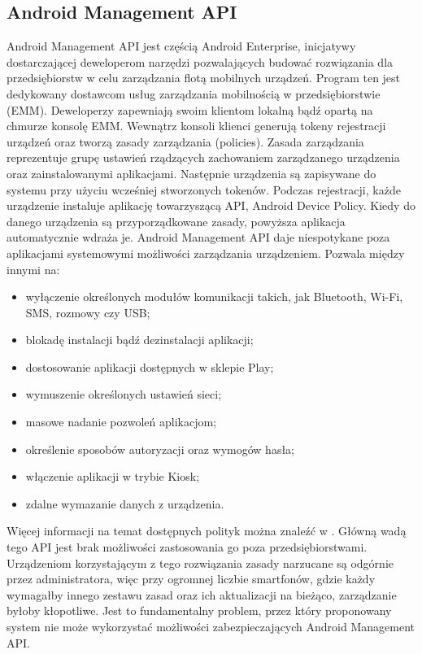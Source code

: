 \subsection{Android Management API}
Android Management API \cite{AM-API} jest częścią Android Enterprise, inicjatywy dostarczającej deweloperom narzędzi pozwalających budować rozwiązania dla przedsiębiorstw w celu zarządzania flotą mobilnych urządzeń. Program ten jest dedykowany dostawcom usług zarządzania mobilnością w przedsiębiorstwie (EMM). Deweloperzy zapewniają swoim klientom lokalną bądź opartą na chmurze konsolę EMM. Wewnątrz konsoli klienci generują tokeny rejestracji urządzeń oraz tworzą zasady zarządzania (policies). Zasada zarządzania reprezentuje grupę ustawień rządzących zachowaniem zarządzanego urządzenia oraz zainstalowanymi aplikacjami. Następnie urządzenia są zapisywane do systemu przy użyciu wcześniej stworzonych tokenów. Podczas rejestracji, każde urządzenie instaluje aplikację towarzyszącą API, Android Device Policy. Kiedy do danego urządzenia są przyporządkowane zasady, powyższa aplikacja automatycznie wdraża je.
\newline\newline
\indent Android Management API daje niespotykane poza aplikacjami systemowymi możliwości
zarządzania urządzeniem. Pozwala między innymi na:
\begin{itemize}
    \item wyłączenie określonych modułów komunikacji takich, jak Bluetooth, Wi-Fi, SMS, rozmowy czy USB;
    \item blokadę instalacji bądź dezinstalacji aplikacji;
    \item dostosowanie aplikacji dostępnych w sklepie Play;
    \item wymuszenie określonych ustawień sieci;
    \item masowe nadanie pozwoleń aplikacjom;
    \item określenie sposobów autoryzacji oraz wymogów hasła;
    \item włączenie aplikacji w trybie Kiosk;
    \item zdalne wymazanie danych z urządzenia.
\end{itemize}
Więcej informacji na temat dostępnych polityk można znaleźć w \cite{AM-Policies}.
\newline\newline
\indent Główną wadą tego API jest brak możliwości zastosowania go poza przedsiębiorstwami. Urządzeniom korzystającym z tego rozwiązania zasady narzucane są odgórnie przez administratora, więc przy ogromnej liczbie smartfonów, gdzie każdy wymagałby innego zestawu zasad oraz ich aktualizacji na bieżąco, zarządzanie byłoby kłopotliwe. Jest to fundamentalny problem, przez który proponowany system nie może wykorzystać możliwości zabezpieczających Android Management API.
